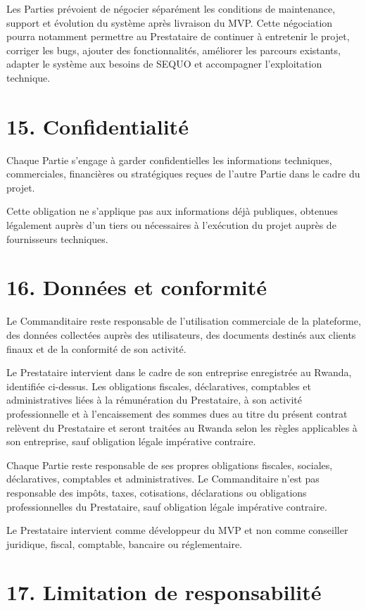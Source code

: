 \documentclass[11pt,a4paper]{article}
\begin{document}
Les Parties prévoient de négocier séparément les conditions de maintenance, support et évolution du système après livraison du MVP. Cette négociation pourra notamment permettre au Prestataire de continuer à entretenir le projet, corriger les bugs, ajouter des fonctionnalités, améliorer les parcours existants, adapter le système aux besoins de SEQUO et accompagner l'exploitation technique.

\section*{15. Confidentialité}

Chaque Partie s'engage à garder confidentielles les informations techniques, commerciales, financières ou stratégiques reçues de l'autre Partie dans le cadre du projet.

Cette obligation ne s'applique pas aux informations déjà publiques, obtenues légalement auprès d'un tiers ou nécessaires à l'exécution du projet auprès de fournisseurs techniques.

\section*{16. Données et conformité}

Le Commanditaire reste responsable de l'utilisation commerciale de la plateforme, des données collectées auprès des utilisateurs, des documents destinés aux clients finaux et de la conformité de son activité.

Le Prestataire intervient dans le cadre de son entreprise enregistrée au Rwanda, identifiée ci-dessus. Les obligations fiscales, déclaratives, comptables et administratives liées à la rémunération du Prestataire, à son activité professionnelle et à l'encaissement des sommes dues au titre du présent contrat relèvent du Prestataire et seront traitées au Rwanda selon les règles applicables à son entreprise, sauf obligation légale impérative contraire.

Chaque Partie reste responsable de ses propres obligations fiscales, sociales, déclaratives, comptables et administratives. Le Commanditaire n'est pas responsable des impôts, taxes, cotisations, déclarations ou obligations professionnelles du Prestataire, sauf obligation légale impérative contraire.

Le Prestataire intervient comme développeur du MVP et non comme conseiller juridique, fiscal, comptable, bancaire ou réglementaire.

\section*{17. Limitation de responsabilité}
\end{document}

